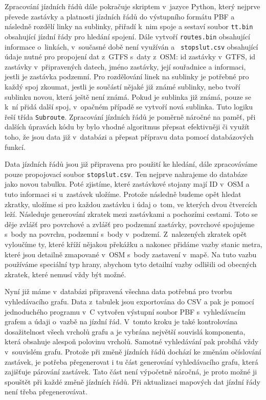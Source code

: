 Zpracování jízdních řádů dále pokračuje skriptem v~jazyce Python, který nejprve
převede zastávky a platnosti jízdních řádů do výstupního formátu PBF a následně
rozdělí linky na sublinky, přiřadí k~nim spoje a sestaví soubor {\tt tt.bin}
obsahující jízdní řády pro hledání spojení. Dále vytvoří {\tt routes.bin}
obsahující informace o~linkách, v~současné době není využíván a {\tt
stopslut.csv} obsahující údaje nutné pro propojení dat z~GTFS s~daty z~OSM: id
zastávky v~GTFS, id zastávky v~připravených datech, jméno zastávky, její
souřadnice a informaci, jestli je zastávka podzemní. Pro rozdělování linek na
sublinky je potřebné pro každý spoj zkoumat, jestli je součástí nějaké již známé
sublinky, nebo tvoří sublinku novou, která ještě není známá. Pokud je sublinka
již známá, pouze se k~ní přidá další spoj, v~opačném případě se vytvoří nová
sublinka. Tuto logiku řeší třída {\tt Subroute}. Zpracování jízdních řádů je
poměrně náročné na paměť, při dalších úpravách kódu by bylo vhodné algoritmus
přepsat efektivněji či využít toho, že jsou data již v~databázi a přepsat
přípravu data pomocí databázových funkcí.  

Data jízdních řádů jsou již připravena pro použití ke hledání, dále zpracováváme
pouze propojovací soubor {\tt stopslut.csv}. Ten nejprve nahrajeme do databáze
jako novou tabulku. Poté zjistíme, které zastávkové stojany mají ID v~OSM a tuto
informaci si u~zastávek uložíme. Protože následně budeme opět hledat zkratky,
uložíme si pro každou zastávku i údaj o~tom, ve kterých dvou čtvercích leží.  
Následuje generování zkratek mezi zastávkami a pochozími cestami. Toto se děje
zvlášť pro povrchové a zvlášť pro podzemní zastávky, povrchové spojujeme s~body
na povrchu, podzemní s~body v~podzemí. Z~nalezených zkratek opět vyloučíme ty,
které kříží nějakou překážku a nakonec přidáme vazby stanic metra, které jsou
detailně zmapované v~OSM s~body zastavení v~mapě. Na tuto vazbu používáme
speciální typ hrany, abychom tyto detailní vazby odlišili od obecných zkratek,
které nemusí vždy být možné. 

Nyní již máme v~databázi připravená všechna data potřebná pro tvorbu
vyhledávacího grafu. Data z~tabulek jsou exportována do CSV a pak je pomocí
jednoduchého programu v~C vytvořen výstupní soubor PBF s~vyhledávacím grafem a
údaji o~vazbě na jízdní řád. V~tomto kroku je také kontrolována dosažitelnost
všech vrcholů grafu a je vybrána největší souvislá komponenta, která obsahuje
alespoň polovinu vrcholů. Samotné vyhledávání pak probíhá vždy v~souvislém grafu.
Protože při změně jízdních řádů dochází ke změnám
očíslování zastávek, je potřeba přegenerovat i tu část generování vyhledávacího
grafu, která zajišťuje párování zastávek. Tato část není výpočetně náročná, je
proto možné ji spouštět při každé změně jízdních řádů. Při aktualizaci mapových
dat jízdní řády není třeba přegenerovávat. 

